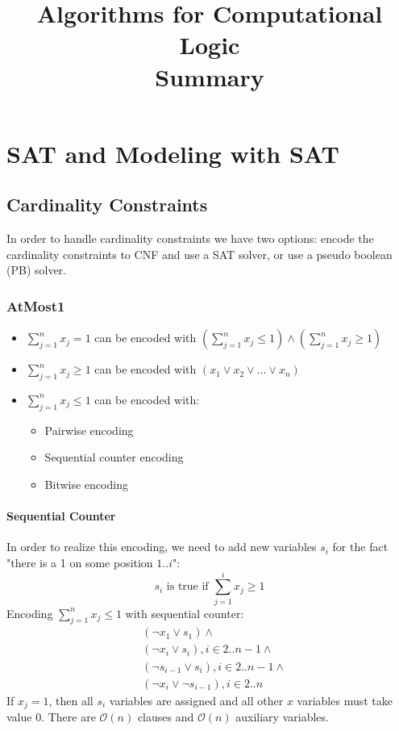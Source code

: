 \documentclass[10pt,a4paper]{report}
\title{\LARGE{Algorithms for Computational Logic} \\ \vspace{0.5cm} \normalsize{Summary}}
\date{}
\begin{document}
\maketitle
\tableofcontents

\chapter{SAT and Modeling with SAT}
\section{Cardinality Constraints}
In order to handle cardinality constraints we have two options: encode the cardinality constraints to CNF and use a SAT solver, or use a pseudo boolean (PB) solver.
\subsection{AtMost1}
\begin{itemize}
\item $\sum_{j=1}^n x_j = 1$ can be encoded with $\left(\sum_{j=1}^n x_j \leq 1\right) \land \left(\sum_{j=1}^n x_j \geq 1\right)$
\item $\sum_{j=1}^n x_j \geq 1$ can be encoded with $(x_1 \lor x_2 \lor ... \lor x_n)$
\item $\sum_{j=1}^n x_j \leq 1$ can be encoded with:
\begin{itemize}
\item Pairwise encoding
\item Sequential counter encoding
\item Bitwise encoding
\end{itemize}
\end{itemize}
\subsubsection{Sequential Counter}
In order to realize this encoding, we need to add new variables $s_i$ for the fact "there is a 1 on some position $1..i$":
$$
s_i \text{ is true if } \sum_{j=1}^i x_j \geq 1
$$
Encoding $\sum_{j=1}^n x_j \leq 1$ with sequential counter:
\begin{align*}
&(\neg x_1 \lor s_1) \land\\
&(\neg x_i \lor s_i), i \in 2..n-1 \land\\
&(\neg s_{i-1} \lor s_i), i \in 2..n-1 \land\\
&(\neg x_i \lor \neg s_{i-1}), i \in 2..n
\end{align*}
If $x_j = 1$, then all $s_i$ variables are assigned and all other $x$ variables must take value 0. There are $\mathcal{O}(n)$ clauses and $\mathcal{O}(n)$ auxiliary variables.
\end{document}
